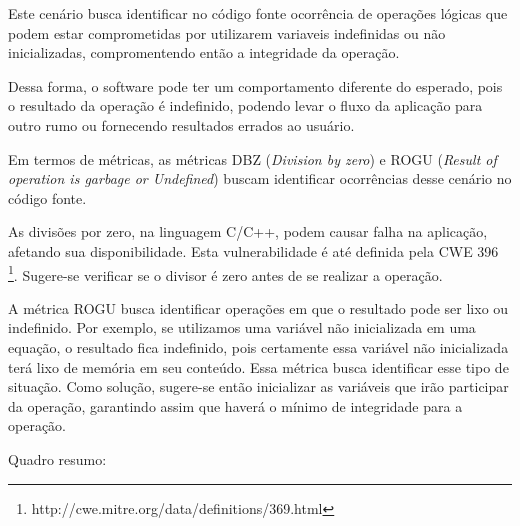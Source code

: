 Este cenário busca identificar no código fonte ocorrência de operações lógicas que podem estar comprometidas por utilizarem variaveis indefinidas ou não inicializadas, compromentendo então a integridade da operação.

Dessa forma, o software pode ter um comportamento diferente do esperado, pois o resultado da operação é indefinido, podendo levar o fluxo da aplicação para outro rumo ou fornecendo resultados errados ao usuário.

Em termos de métricas, as métricas DBZ (\emph{Division by zero}) e ROGU (\emph{Result of operation is garbage or Undefined}) buscam identificar ocorrências desse cenário no código fonte. 

As divisões por zero, na linguagem C/C++, podem causar falha na aplicação, afetando sua disponibilidade. Esta vulnerabilidade é até definida pela CWE 396 \footnote{http://cwe.mitre.org/data/definitions/369.html}. Sugere-se verificar se o divisor é zero antes de se realizar a operação.

A métrica ROGU busca identificar operações em que o resultado pode ser lixo ou indefinido. Por exemplo, se utilizamos uma variável não inicializada em uma equação, o resultado fica indefinido, pois certamente essa variável não inicializada terá lixo de memória em seu conteúdo. Essa métrica busca identificar esse tipo de situação. Como solução, sugere-se então inicializar as variáveis que irão participar da operação, garantindo assim que haverá o mínimo de integridade para a operação.

 Quadro resumo:

